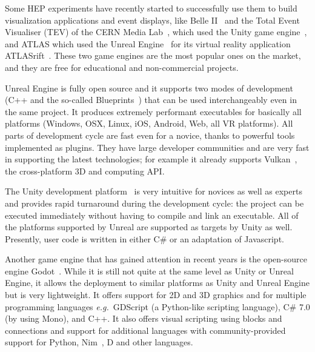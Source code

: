 \documentclass[12pt,a4paper]{article}
\begin{document}
Some HEP experiments have recently started to successfully use them to build visualization applications and event displays,
like Belle II~\cite{BelleIIVR} and the Total Event Visualiser (TEV) of the CERN Media Lab~\cite{CERNTEV},
which used the Unity game engine~\cite{Unity3D}, and ATLAS which used the Unreal Engine~\cite{EpicUnreal} for
its virtual reality application ATLASrift~\cite{ATLASRift}. These two game engines are the most popular ones on the market, and they are
free for educational and non-commercial projects.

Unreal Engine is fully open source and it supports two modes of development (C++ and the so-called Blueprints~\cite{UnrealEngineBlueprints}) that can be used
interchangeably even in the same project. It produces extremely performant executables for basically all platforms
(Windows, OSX, Linux, iOS, Android, Web, all VR platforms). All parts of development cycle are fast even for a novice,
thanks to powerful tools implemented as plugins. They have large developer communities and are very fast in supporting the latest technologies;
for example it already supports Vulkan~\cite{vulkanAPI}, the cross-platform 3D and computing API.

The Unity development platform~\cite{Unity3D} is very intuitive for novices as
well as experts and provides rapid turnaround during the development cycle: the project can be executed immediately without having to
compile and link an executable. All of the platforms supported by Unreal are supported as targets by Unity as well. Presently, user code is written in either
C\# or an adaptation of Javascript.



Another game engine that has gained attention in recent years is the open-source engine Godot~\cite{Godot}.
While it is still not quite at the same level as Unity or Unreal Engine, it allows the deployment to similar platforms as Unity and Unreal
Engine but is very lightweight.
It offers support for 2D and 3D graphics and for multiple programming languages {\it e.g.}\ GDScript (a Python-like scripting language),
 C\# 7.0 (by using Mono), and C++.
It also offers visual scripting using blocks and connections and support for additional languages with
community-provided support for Python, Nim~\cite{nimLang}, D and other languages.
\end{document}
